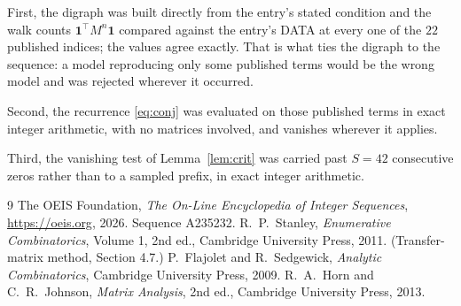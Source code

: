 \documentclass[11pt,a4paper]{article}
\theoremstyle{plain}
\theoremstyle{definition}
\begin{document}
First, the digraph was built directly from the entry's stated condition and the walk counts
$\mathbf{1}^{\!\top}M^{n}\mathbf{1}$ compared against the entry's DATA at every one of
the $22$ published indices; the values agree exactly. That is what ties the digraph to
the sequence: a model reproducing only some published terms would be the wrong model and
was rejected wherever it occurred.

Second, the recurrence \eqref{eq:conj} was evaluated on those published terms in exact
integer arithmetic, with no matrices involved, and vanishes wherever it applies.

Third, the vanishing test of Lemma~\ref{lem:crit} was carried past $S=42$ consecutive
zeros rather than to a sampled prefix, in exact integer arithmetic.

\begin{thebibliography}{9}
 The OEIS Foundation, \emph{The On-Line Encyclopedia of Integer
Sequences}, \url{https://oeis.org}, 2026. Sequence A235232.
 R.~P.~Stanley, \emph{Enumerative Combinatorics}, Volume 1, 2nd ed.,
Cambridge University Press, 2011. (Transfer-matrix method, Section 4.7.)
 P.~Flajolet and R.~Sedgewick, \emph{Analytic Combinatorics}, Cambridge
University Press, 2009.
 R.~A.~Horn and C.~R.~Johnson, \emph{Matrix Analysis}, 2nd ed., Cambridge
University Press, 2013.
\end{thebibliography}
\end{document}
